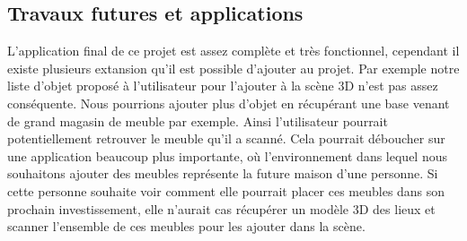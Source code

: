 \subsection{Travaux futures et applications}
L'application final de ce projet est assez complète et très fonctionnel, cependant il existe plusieurs extansion qu'il 
est possible d'ajouter au projet. Par exemple notre liste d'objet proposé à l'utilisateur pour l'ajouter à la 
scène 3D n'est pas assez conséquente. Nous pourrions ajouter plus d'objet en récupérant une base venant de grand magasin
de meuble par exemple. Ainsi l'utilisateur pourrait potentiellement retrouver le meuble qu'il a scanné. Cela pourrait
déboucher sur une application beaucoup plus importante, où l'environnement dans lequel nous souhaitons ajouter des meubles
représente la future maison d'une personne. Si cette personne souhaite voir comment elle pourrait placer ces meubles dans 
son prochain investissement, elle n'aurait cas récupérer un modèle 3D des lieux et scanner l'ensemble de ces meubles pour
les ajouter dans la scène.
